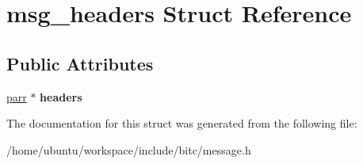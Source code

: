 \hypertarget{structmsg__headers}{\section{msg\-\_\-headers Struct Reference}
\label{structmsg__headers}
}
\subsection*{Public Attributes}
\begin{DoxyCompactItemize}
\item 
\hypertarget{structmsg__headers_a3126442c9eb4c2822334fb038aa02816}{\hyperlink{structparr}{parr} $\ast$ {\bfseries headers}}\label{structmsg__headers_a3126442c9eb4c2822334fb038aa02816}

\end{DoxyCompactItemize}


The documentation for this struct was generated from the following file\-:\begin{DoxyCompactItemize}
\item 
/home/ubuntu/workspace/include/bitc/message.\-h\end{DoxyCompactItemize}
